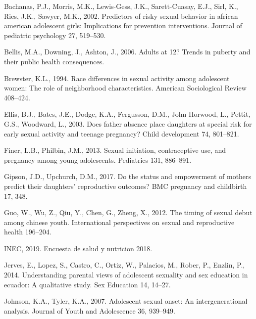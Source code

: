 \documentclass[
]{article}
\newlength{\cslhangindent}
\newenvironment{cslreferences}%
  {\setlength{\parindent}{0pt}%
  \everypar{\setlength{\hangindent}{\cslhangindent}}\ignorespaces}%
  {\par}
\begin{document}
\hypertarget{refs}{}
\begin{cslreferences}
\leavevmode\hypertarget{ref-bachanas2002predictors}{}%
Bachanas, P.J., Morris, M.K., Lewis-Gess, J.K., Sarett-Cuasay, E.J.,
Sirl, K., Ries, J.K., Sawyer, M.K., 2002. Predictors of risky sexual
behavior in african american adolescent girls: Implications for
prevention interventions. Journal of pediatric psychology 27, 519--530.

\leavevmode\hypertarget{ref-bellis2006adults}{}%
Bellis, M.A., Downing, J., Ashton, J., 2006. Adults at 12? Trends in
puberty and their public health consequences.

\leavevmode\hypertarget{ref-brewster1994race}{}%
Brewster, K.L., 1994. Race differences in sexual activity among
adolescent women: The role of neighborhood characteristics. American
Sociological Review 408--424.

\leavevmode\hypertarget{ref-ellis2003does}{}%
Ellis, B.J., Bates, J.E., Dodge, K.A., Fergusson, D.M., John Horwood,
L., Pettit, G.S., Woodward, L., 2003. Does father absence place
daughters at special risk for early sexual activity and teenage
pregnancy? Child development 74, 801--821.

\leavevmode\hypertarget{ref-finer2013sexual}{}%
Finer, L.B., Philbin, J.M., 2013. Sexual initiation, contraceptive use,
and pregnancy among young adolescents. Pediatrics 131, 886--891.

\leavevmode\hypertarget{ref-gipson2017status}{}%
Gipson, J.D., Upchurch, D.M., 2017. Do the status and empowerment of
mothers predict their daughters' reproductive outcomes? BMC pregnancy
and childbirth 17, 348.

\leavevmode\hypertarget{ref-guo2012timing}{}%
Guo, W., Wu, Z., Qiu, Y., Chen, G., Zheng, X., 2012. The timing of
sexual debut among chinese youth. International perspectives on sexual
and reproductive health 196--204.

\leavevmode\hypertarget{ref-inec2019}{}%
INEC, 2019. Encuesta de salud y nutricion 2018.

\leavevmode\hypertarget{ref-jerves2014understanding}{}%
Jerves, E., Lopez, S., Castro, C., Ortiz, W., Palacios, M., Rober, P.,
Enzlin, P., 2014. Understanding parental views of adolescent sexuality
and sex education in ecuador: A qualitative study. Sex Education 14,
14--27.

\leavevmode\hypertarget{ref-johnson2007adolescent}{}%
Johnson, K.A., Tyler, K.A., 2007. Adolescent sexual onset: An
intergenerational analysis. Journal of Youth and Adolescence 36,
939--949.


\end{cslreferences}
\end{document}
